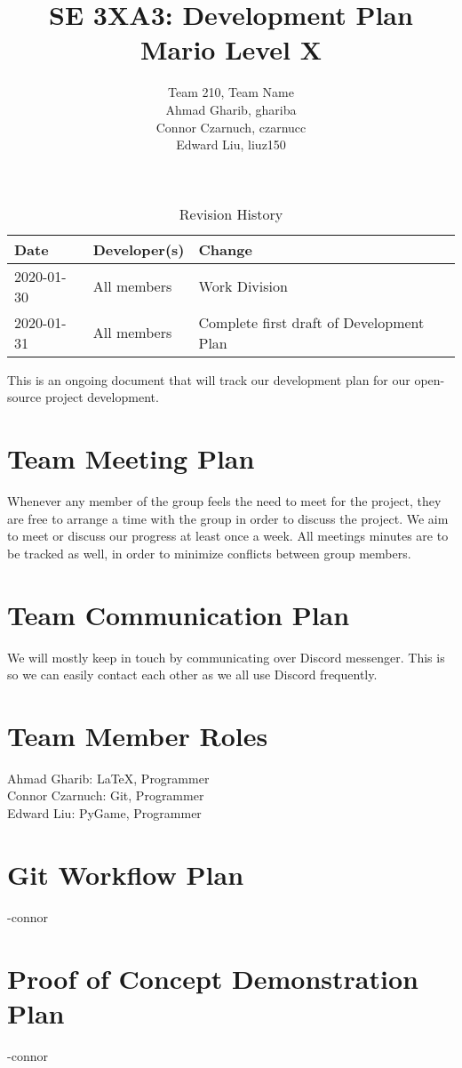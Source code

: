 \documentclass{article}
\title{SE 3XA3: Development Plan\\ Mario Level X}
\author{Team 210, Team Name
		\\ Ahmad Gharib, ghariba
		\\ Connor Czarnuch, czarnucc
		\\ Edward Liu, liuz150
}
\date{}
\begin{document}
\begin{table}[hp]
\caption{Revision History} \label{TblRevisionHistory}
\begin{tabularx}{\textwidth}{llX}
\toprule
\textbf{Date} & \textbf{Developer(s)} & \textbf{Change}\\
\midrule
2020-01-30 & All members & Work Division\\
2020-01-31 & All members & Complete first draft of Development Plan\\
\bottomrule
\end{tabularx}
\end{table}

\newpage

\maketitle

This is an ongoing document that will track our development plan for our open-source project development.

\section{Team Meeting Plan}
Whenever any member of the group feels the need to meet for the project, they are free to arrange a time with the group in order to discuss the project. We aim to meet or discuss our progress at least once a week. All meetings minutes are to be tracked as well, in order to minimize conflicts between group members.
\section{Team Communication Plan}
We will mostly keep in touch by communicating over Discord messenger. This is so we can easily contact each other as we all use Discord frequently.
\section{Team Member Roles}
Ahmad Gharib: LaTeX, Programmer \\
Connor Czarnuch: Git, Programmer \\
Edward Liu: PyGame, Programmer
\section{Git Workflow Plan}
-connor
\section{Proof of Concept Demonstration Plan}
-connor
\end{document}
